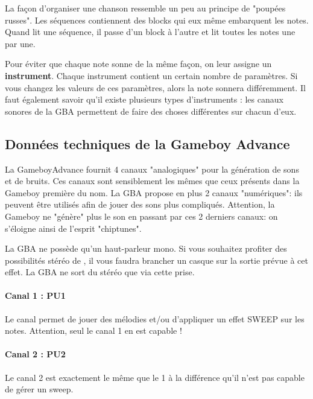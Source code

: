 \documentclass[12pt,a4paper]{article}
\begin{document}
    La façon d'organiser une chanson ressemble un peu au principe de "poupées russes".
    Les séquences contiennent des blocks qui eux même embarquent les notes.
    Quand \FAT lit une séquence, il passe d'un block à l'autre et lit toutes les notes une par une.
    \medskip
    
    Pour éviter que chaque note sonne de la même façon, on leur assigne un {\bf instrument}.
    Chaque instrument contient un certain nombre de paramètres.
    Si vous changez les valeurs de ces paramètres, alors la note sonnera différemment.
    Il faut également savoir qu'il existe plusieurs types d'instruments : les canaux sonores de la GBA permettent de faire des choses différentes sur chacun d'eux.
    
    \subsection{Données techniques de la Gameboy Advance}
    
    La GameboyAdvance fournit 4 canaux "analogiques" pour la génération de sons et de bruits.
    Ces canaux sont sensiblement les mêmes que ceux présents dans la Gameboy première du nom.
    La GBA propose en plus 2 canaux "numériques": ils peuvent être utilisés afin de jouer des sons plus compliqués.
    Attention, la Gameboy ne "génère" plus le son en passant par ces 2 derniers canaux: on s'éloigne ainsi de l'esprit "chiptunes".
    
    La GBA ne possède qu'un haut-parleur mono.
    Si vous souhaitez profiter des possibilités stéréo de \FAT, il vous faudra brancher un casque sur la sortie prévue à cet effet.
    La GBA ne sort du stéréo que via cette prise.
    
    \paragraph{Canal 1 : PU1} Le canal permet de jouer des mélodies et/ou d'appliquer un effet SWEEP sur les notes. Attention, seul le canal 1 en est capable !


    \paragraph{Canal 2 : PU2} Le canal 2 est exactement le même que le 1 à la différence qu'il n'est pas capable de gérer un sweep.
\end{document}
